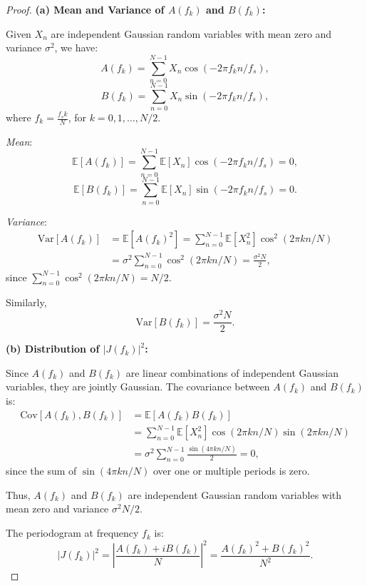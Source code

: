 \documentclass[11pt]{article}
\begin{document}
\begin{solution}
    \begin{proof}
    \textbf{(a) Mean and Variance of \(A(f_k)\) and \(B(f_k)\):}
    
    Given \(X_n\) are independent Gaussian random variables with mean zero and variance \(\sigma^2\), we have:
    \[
    A(f_k) = \sum_{n=0}^{N-1} X_n \cos\left(-2\pi f_k n / f_s\right),
    \]
    \[
    B(f_k) = \sum_{n=0}^{N-1} X_n \sin\left(-2\pi f_k n / f_s\right),
    \]
    where \(f_k = \frac{f_s k}{N}\), for \(k = 0, 1, \dots, N/2\).
    
    \emph{Mean}:
    \[
    \mathbb{E}[A(f_k)] = \sum_{n=0}^{N-1} \mathbb{E}[X_n] \cos\left(-2\pi f_k n / f_s\right) = 0,
    \]
    \[
    \mathbb{E}[B(f_k)] = \sum_{n=0}^{N-1} \mathbb{E}[X_n] \sin\left(-2\pi f_k n / f_s\right) = 0.
    \]
    
    \emph{Variance}:
    \begin{align*}
    \text{Var}[A(f_k)] &= \mathbb{E}[A(f_k)^2] = \sum_{n=0}^{N-1} \mathbb{E}[X_n^2] \cos^2\left(2\pi k n / N\right) \\
    &= \sigma^2 \sum_{n=0}^{N-1} \cos^2\left(2\pi k n / N\right) = \frac{\sigma^2 N}{2},
    \end{align*}
    since \(\sum_{n=0}^{N-1} \cos^2\left(2\pi k n / N\right) = N/2\).
    
    Similarly,
    \[
    \text{Var}[B(f_k)] = \frac{\sigma^2 N}{2}.
    \]
    
    \textbf{(b) Distribution of \(|J(f_k)|^2\):}
    
    Since \(A(f_k)\) and \(B(f_k)\) are linear combinations of independent Gaussian variables, they are jointly Gaussian. The covariance between \(A(f_k)\) and \(B(f_k)\) is:
    \begin{align*}
    \text{Cov}[A(f_k), B(f_k)] &= \mathbb{E}[A(f_k) B(f_k)] \\
    &= \sum_{n=0}^{N-1} \mathbb{E}[X_n^2] \cos\left(2\pi k n / N\right) \sin\left(2\pi k n / N\right) \\
    &= \sigma^2 \sum_{n=0}^{N-1} \frac{\sin\left(4\pi k n / N\right)}{2} = 0,
    \end{align*}
    since the sum of \(\sin\left(4\pi k n / N\right)\) over one or multiple periods is zero.
    
    Thus, \(A(f_k)\) and \(B(f_k)\) are independent Gaussian random variables with mean zero and variance \(\sigma^2 N/2\).
    
    The periodogram at frequency \(f_k\) is:
    \[
    |J(f_k)|^2 = \left|\frac{A(f_k) + i B(f_k)}{N}\right|^2 = \frac{A(f_k)^2 + B(f_k)^2}{N^2}.
    \]
    

\end{proof}
\end{solution}
\end{document}
